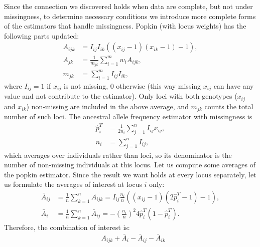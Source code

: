 \documentclass[9pt,twocolumn,twoside]{gsajnl}
\newcommand{\xij}[1][j]{x_{i#1}}
\newcommand{\pith}{\hat{p}_i^T}
\newcommand{\Ajk}[1][k]{A_{j#1}}
\begin{document}
\begin{appendices}
  Since the connection we discovered holds when data are complete, but not under missingness, to determine necessary conditions we introduce more complete forms of the estimators that handle missingness.
  Popkin (with locus weights) has the following parts updated:
  \begin{equation*}
    \begin{split}
      A_{ijk}
      &=
        I_{ij} I_{ik} ( (\xij-1)(\xij[k]-1) - 1 )
      , \\
      \Ajk
      &=
        \frac{1}{m_{jk}} \sum_{i=1}^m w_i A_{ijk}
        , \\
      m_{jk}
      &=
        \sum_{i=1}^m I_{ij} I_{ik}
        ,
    \end{split}
  \end{equation*}
  where $I_{ij} = 1$ if $\xij$ is not missing, 0 otherwise (this way missing $\xij$ can have any value and not contribute to the estimator).
  Only loci with both genotypes ($\xij$ and $\xij[k]$) non-missing are included in the above average, and $m_{jk}$ counts the total number of such loci.
  The ancestral allele frequency estimator with missingness is
  \begin{align*}
    \pith
    &=
      \frac{1}{2 n_i} \sum_{j=1}^n I_{ij} \xij
      , \\
    n_i
    &=
      \sum_{j=1}^n I_{ij}
      ,
  \end{align*}
  which averages over individuals rather than loci, so its denominator is the number of non-missing individuals at this locus.
  Let us compute some averages of the popkin estimator.
  Since the result we want holds at every locus separately, let us formulate the averages of interest at locus $i$ only:
  \begin{align*}
    \bar{A}_{ij}
    &=
      \frac{1}{n} \sum_{k=1}^n A_{ijk}
      =
      I_{ij} \frac{n_i}{n} \left( ( \xij - 1 ) \left( 2 \pith - 1 \right) - 1 \right)
      , \\
    \bar{A}_i
    &=
      \frac{1}{n} \sum_{k=1}^n \bar{A}_{ij}
      =
      - \left( \frac{n_i}{n} \right)^2 4 \pith \left( 1 - \pith \right)
      .
  \end{align*}
  Therefore, the combination of interest is:
  \begin{align*}
    & A_{ijk} + \bar{A}_i - \bar{A}_{ij}  - \bar{A}_{ik} \\

\end{align*}
\end{appendices}
\end{document}

